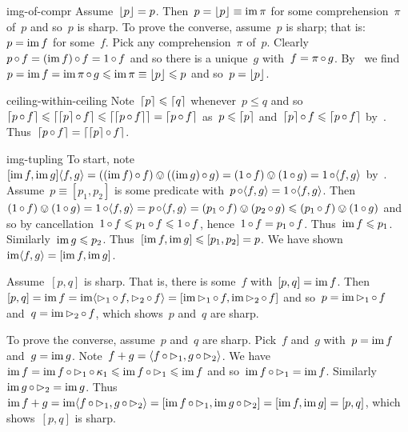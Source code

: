 \begin{solution}{img-of-compr}%
Assume~$\floor{p} = p$.
    Then~$p = \floor{p} \equiv \IM \pi$ for some comprehension~$\pi$ of~$p$
        and so~$p$ is sharp.
To prove the converse, assume~$p$ is sharp;
    that is: $p = \IM f$ for some~$f$.
Pick any comprehension~$\pi$ of~$p$.
    Clearly~$p \after f = (\IM f) \after f = 1 \after f$
        and so there is a unique~$g$ with~$f = \pi \after g$.
    By~
        we find~$p = \IM f = \IM \pi \after g \leq \IM \pi \equiv \floor{p} \leq p$
        and so~$p = \floor{p}$.
\end{solution}
\begin{solution}{ceiling-within-ceiling}%
Note~$\ceil{p} \leq \ceil{q}$  whenever~$p \leq q$
    and so~$\ceil{p \after f} \leq \ceil{\ceil{p} \after f}
        \leq \ceil{\ceil{p \after f}} = \ceil{p \after f}$
        as~$p \leq \ceil{p}$
        and~$\ceil{p} \after f \leq \ceil{p \after f}$ by~.
    Thus~$\ceil{p \after f} = \ceil{\ceil{p} \after f}$.
\end{solution}
\begin{solution}{img-tupling}%
To start, note ~$[\IM f, \IM g]
        \langle f,g\rangle = ((\IM f) \after f) \ovee ((\IM g) \after g)
            = (1 \after f) \ovee (1 \after g) = 1 \after \langle f,g\rangle$
            by~.
    Assume~$p\equiv[p_1,p_2]$ is some predicate with~$p \after \langle f,g \rangle
        = 1 \after \langle f, g \rangle$.
    Then~$(1 \after f) \ovee (1 \after g)
        = 1 \after \langle f, g \rangle 
        = p \after \langle f, g \rangle
        = (p_1 \after f) \ovee (p_2 \after g)
        \leq (p_1 \after f) \ovee (1 \after g)$
        and so by cancellation~$1 \after f \leq p_1 \after f \leq 1 \after f$,
        hence~$1 \after f = p_1 \after f$.
Thus~$\IM f \leq p_1$.
Similarly~$\IM g \leq p_2$.
    Thus~$[\IM f, \IM g] \leq [p_1, p_2] = p$.
We have shown~$\IM \langle f, g\rangle = [\IM f, \IM g]$.

Assume~$[p,q]$ is sharp.
    That is, there is some~$f$ with~$[p,q] = \IM f$.
    Then~$[p,q] = \IM f = \IM \langle \pproj_1 \after f, \pproj_2 \after f \rangle 
    = [\IM \pproj_1 \after f, \IM \pproj_2 \after f]$
    and so~$p = \IM \pproj_1 \after f$
    and~$q = \IM \pproj_2 \after f$,
    which shows~$p$ and~$q$ are sharp.

To prove the converse, assume~$p$ and~$q$ are sharp.
Pick~$f$ and~$g$ with~$p = \IM f$ and~$g = \IM g$.
Note~$f+g = \langle f \after \pproj_1 , g \after \pproj_2 \rangle$.
We have~$\IM f = \IM f \after \pproj_1 \after \kappa_1
                \leq \IM f \after \pproj_1  \leq \IM f$
                and so~$\IM f \after \pproj_1 = \IM f$.
Similarly~$\IM g \after \pproj_2 = \IM g$.
Thus~$\IM f+g =  \IM \langle f \after \pproj_1 , g \after \pproj_2 \rangle
    =  [\IM f \after \pproj_1, \IM g \after \pproj_2]
    = [\IM f, \IM g] = [p,q]$, which shows~$[p,q]$ is sharp.
\end{solution}
